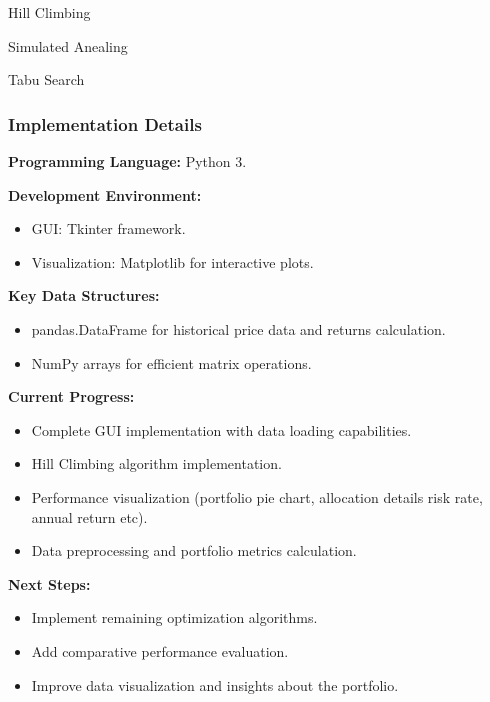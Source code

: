 \documentclass{beamer}
\begin{document}
\begin{frame}{Hill Climbing}

    
    

\end{frame}


\begin{frame}{Simulated Anealing}

    
    

\end{frame}

\begin{frame}{Tabu Search}

    
    

\end{frame}
\begin{frame}
    \frametitle{Implementation Details}

    \textbf{Programming Language:} Python 3.

    \textbf{Development Environment:}
    \begin{itemize}
        \item GUI: Tkinter framework.
        \item Visualization: Matplotlib for interactive plots.
    \end{itemize}

    \textbf{Key Data Structures:}
    \begin{itemize}
        \item pandas.DataFrame for historical price data and returns calculation.
        \item NumPy arrays for efficient matrix operations.
    \end{itemize}

    \textbf{Current Progress:}
    \begin{itemize}
        \item Complete GUI implementation with data loading capabilities.
        \item Hill Climbing algorithm implementation.
        \item Performance visualization (portfolio pie chart, allocation details risk rate, annual return etc).
        \item Data preprocessing and portfolio metrics calculation.
    \end{itemize}

    \textbf{Next Steps:}
    \begin{itemize}
        \item Implement remaining optimization algorithms.
        \item Add comparative performance evaluation.
        \item Improve data visualization and insights about the portfolio.
    \end{itemize}
\end{frame}
\end{document}
